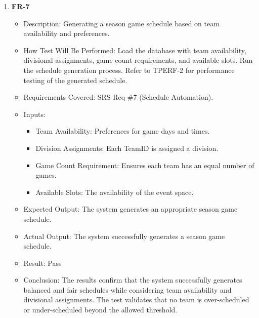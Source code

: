 \documentclass[12pt, titlepage]{article}
\begin{document}
\begin{enumerate}
      \item \textbf{FR-7}  
      \begin{itemize}
          \item Description: Generating a season game schedule based on team availability and preferences.
          \item How Test Will Be Performed: Load the database with team availability, divisional assignments, game count requirements, and available slots. Run the schedule generation process. Refer to TPERF-2 for performance testing of the generated schedule.
          \item Requirements Covered: SRS Req \#7 (Schedule Automation).
          \item Inputs:  
              \begin{itemize}
                  \item Team Availability: Preferences for game days and times.  
                  \item Division Assignments: Each TeamID is assigned a division.  
                  \item Game Count Requirement: Ensures each team has an equal number of games.  
                  \item Available Slots: The availability of the event space.  
              \end{itemize}
          \item Expected Output: The system generates an appropriate season game schedule.
          \item Actual Output: The system successfully generates a season game schedule.
          \item Result: Pass
          \item Conclusion: The results confirm that the system successfully generates balanced and fair schedules while considering team availability and divisional assignments.
		  The test validates that no team is over-scheduled or under-scheduled beyond the allowed threshold.
      \end{itemize}


\end{enumerate}
\end{document}
